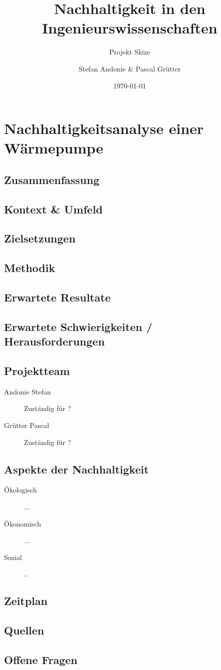 \documentclass[10pt,paper=a4,final]{scrartcl}
\title{Nachhaltigkeit in den Ingenieurswissenschaften}
\subtitle{Projekt Skize}
\author{Stefan Andonie \& Pascal Grütter}
\date{\today{}}
\begin{document}
\section*{Nachhaltigkeitsanalyse einer Wärmepumpe}

\subsection*{Zusammenfassung}

\subsection*{Kontext \& Umfeld}

\subsection*{Zielsetzungen}

\subsection*{Methodik}

\subsection*{Erwartete Resultate}

\subsection*{Erwartete Schwierigkeiten / Herausforderungen}

\subsection*{Projektteam}

  \begin{description}
    \item[Andonie Stefan] Zuständig für ?
    \item[Grütter Pascal] Zuständig für ?
  \end{description}

\subsection*{Aspekte der Nachhaltigkeit}

  \begin{description}
    \item[Ökologisch] ...
    \item[Ökonomisch] ...
    \item[Sozial] ..
  \end{description}

\subsection*{Zeitplan}

\subsection*{Quellen}

\subsection*{Offene Fragen}
\end{document}
